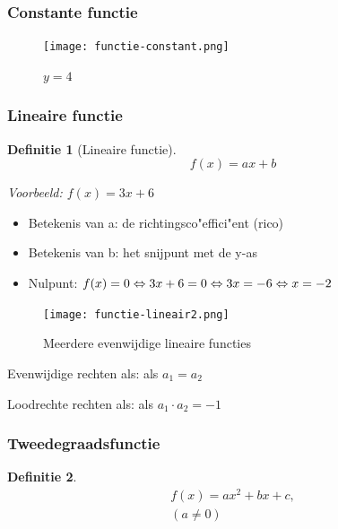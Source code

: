 \documentclass{article}
\newtheorem{theorem}{Definitie}[section]
\begin{document}
\subsubsection{Constante functie}

\begin{figure}[H]
    \centering
    \texttt{[image: functie-constant.png]}
    \caption{$y=4$}
\end{figure}

\subsubsection{Lineaire functie}

\begin{theorem}[Lineaire functie]
    \begin{equation}
        f(x) = ax + b
    \end{equation}


Voorbeeld: $f(x) = 3x + 6$
\end{theorem}

\begin{itemize}
    \item Betekenis van a: de richtingsco"effici"ent (rico)
    \item Betekenis van b: het snijpunt met de y-as
    \item Nulpunt: $f(x) = 0 \\ \Leftrightarrow 3x + 6 = 0 \\ \Leftrightarrow 3x = -6  \\ \Leftrightarrow x = -2$
\end{itemize}

\begin{figure}[H]
    \centering
    \texttt{[image: functie-lineair2.png]}
    \caption{Meerdere evenwijdige lineaire functies}
\end{figure}

Evenwijdige rechten als: als $a_1 = a_2$

Loodrechte rechten als: als $a_1 \cdot a_2 = -1$

\subsubsection{Tweedegraadsfunctie}

\begin{theorem}
\begin{equation}
    \begin{aligned}
        f(x) = ax^2 + bx + c,\\
        (a \neq 0)
    \end{aligned}
\end{equation}


\end{theorem}
\end{document}
